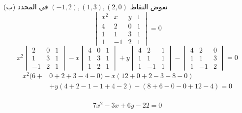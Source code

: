     \begin{frame}
    	
\begin{exampleblock}{}
	    	(ب) نعوض النقاط 
    	$(-1,2), (1,3), (2,0)$
    	في المحدد
    	\[
    	\begin{vmatrix}
    		x^2 & x& y& 1\\
    		4 & 2 & 0 & 1\\
    		1 & 1& 3 & 1\\
    		1 & -1 & 2&1
    	\end{vmatrix} = 0
    	\]
    	\[
    	x^2\begin{vmatrix}
    		2 & 0&1\\
    		1&3&1\\
    		-1&2&1
    	\end{vmatrix}
    	-x \begin{vmatrix}
    		4&0&1\\
    		1&3&1\\
    		1&2&1
    	\end{vmatrix}
    	+ y\begin{vmatrix}
    		4&2&1\\
    		1&1&1\\
    		1&-1&1
    	\end{vmatrix}
    	-\begin{vmatrix}
    		4&2&0\\
    		1&1&3\\
    		1&-1&2
    	\end{vmatrix} = 0
    	\]
    	\begin{align*}
    		x^2(6+&0+2+3-4-0) - x(12+0+2-3-8-0)\\
    		&+ y (4+2-1-1+4-2) - (8+6-0-0+12-4) = 0
    	\end{align*}\\
    	\[
    	7x^2 - 3x + 6y - 22=0
    	\]
\end{exampleblock}
    \end{frame}
